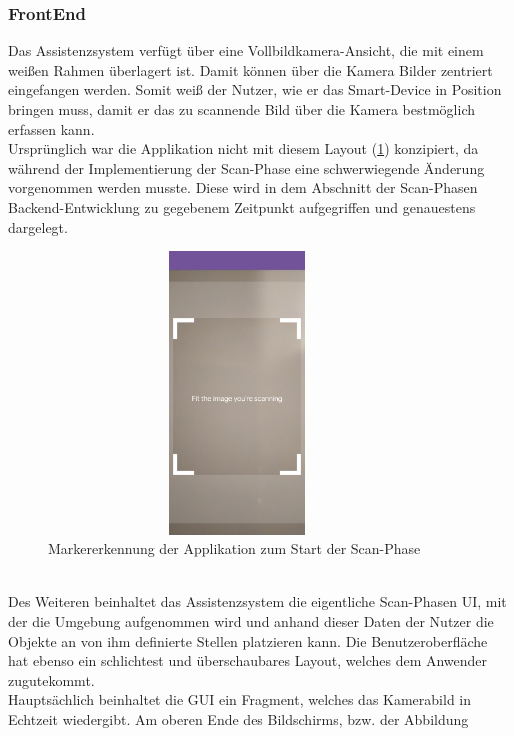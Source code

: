 \subsubsection{FrontEnd}
Das Assistenzsystem verfügt über eine Vollbildkamera-Ansicht, die mit einem weißen Rahmen überlagert ist. Damit können über die Kamera Bilder zentriert 
eingefangen werden. Somit weiß der Nutzer, wie er das Smart-Device in Position bringen muss, damit er das zu scannende Bild über die Kamera 
bestmöglich erfassen kann. 
\\ 
\linebreak
Ursprünglich war die Applikation nicht mit diesem Layout (\ref{pic:image_tracking}) konzipiert, da während der Implementierung der Scan-Phase eine 
schwerwiegende Änderung vorgenommen werden musste. Diese wird in dem Abschnitt der Scan-Phasen Backend-Entwicklung zu gegebenem Zeitpunkt 
aufgegriffen und genauestens dargelegt. 
\begin{figure}[hbt!]
    \centering
    \includegraphics[width=10cm,height=7.5cm,keepaspectratio]{4Umsetzung/Bilder/image_tracking.jpg}
    \caption{Markererkennung der Applikation zum Start der Scan-Phase}
    \label{pic:image_tracking}
\end{figure}
\pagebreak 
\\
\linebreak 
Des Weiteren beinhaltet das Assistenzsystem die eigentliche Scan-Phasen \acs{UI}, mit der die Umgebung aufgenommen wird und anhand dieser Daten 
der Nutzer die Objekte an von ihm definierte Stellen platzieren kann. Die Benutzeroberfläche hat ebenso ein schlichtest und überschaubares Layout, 
welches dem Anwender zugutekommt. 
\\ 
Hauptsächlich beinhaltet die \acs{GUI} ein Fragment, welches das Kamerabild in Echtzeit wiedergibt. Am oberen Ende des Bildschirms, bzw. der Abbildung 
